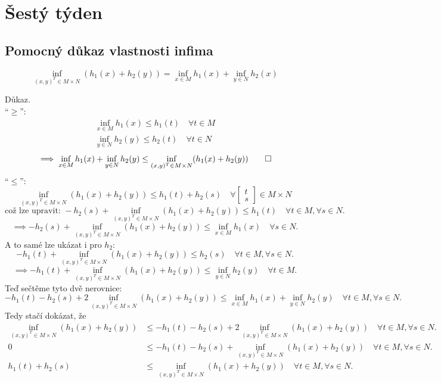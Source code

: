 \section{Šestý týden}

\subsection{Pomocný důkaz vlastnosti infima}\label{infPomoc}
\[
    \inf_{(x, y)^T \in M \times N} (h_1(x) + h_2(y)) = \inf_{x\in M}h_1(x) + \inf_{y\in N}h_2(x)
\]

Důkaz.\\
\enquote{$\geq$}:
\begin{align*}
    \inf_{x \in M} h_1(x) \leq h_1(t) \quad \forall t \in M \\
    \inf_{y \in N} h_2(y) \leq h_2(t) \quad \forall t \in N
\end{align*}
\[
    \implies \inf_{x\in M} h_1(x) + \inf_{y\in N}h_2(y) \leq \inf_{(x,y)^T \in M \times N}(h_1(x) + h_2(y)) \qed
\]
\enquote{$\leq$}:
\[
    \inf_{(x,y)^T \in M \times N}(h_1(x) + h_2(y)) \leq h_1(t) + h_2(s) \quad \forall 
    \begin{bmatrix}
        t \\
        s    
    \end{bmatrix} \in M \times N
\]
\[
    \text{což lze upravit: } -h_2(s) + \inf_{(x, y)^T \in M \times N}(h_1(x) + h_2(y)) \leq h_1(t) \quad \forall t\in M, 
    \forall s\in N.
\]
\[
    \implies -h_2(s) + \inf_{(x, y)^T \in M \times N}(h_1(x) + h_2(y)) \leq \inf_{x\in M} h_1(x) \quad \forall s\in N.
\]
A to samé lze ukázat i pro $h_2$:
\[
    -h_1(t) + \inf_{(x, y)^T \in M \times N}(h_1(x) + h_2(y)) \leq h_2(s) \quad \forall t\in M, \forall s\in N.
\]
\[
    \implies -h_1(t) + \inf_{(x, y)^T \in M \times N}(h_1(x) + h_2(y)) \leq \inf_{y\in N} h_2(y) \quad \forall t\in M.
\]
Teď sečtěme tyto dvě nerovnice:
\[
    -h_1(t) - h_2(s) + 2 \inf_{(x, y)^T \in M \times N}(h_1(x) + h_2(y)) \leq \inf_{x\in M} h_1(x) + \inf_{y\in N} h_2(y)
    \quad \forall t\in M, \forall s\in N.
\]
Tedy stačí dokázat, že
\begin{align*}
    \inf_{(x,y)^T \in M \times N}(h_1(x) + h_2(y)) &\leq -h_1(t) - h_2(s) + 2 \inf_{(x, y)^T \in M \times N}(h_1(x) + h_2(y)) 
    \quad \forall t\in M, \forall s\in N.\\
    0 &\leq -h_1(t) - h_2(s) + \inf_{(x, y)^T \in M \times N}(h_1(x) + h_2(y)) \quad \forall t\in M, \forall s\in N.\\
    h_1(t) + h_2(s) &\leq \inf_{(x, y)^T \in M \times N}(h_1(x) + h_2(y)) \quad \forall t\in M, \forall s\in N.
\end{align*}

